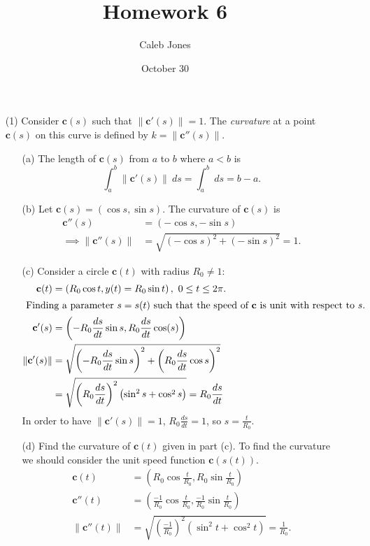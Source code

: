 \documentclass{article}
\title{Homework 6}
\author{Caleb Jones}
\date{October 30}
\renewcommand\vec[1]{\mathbf{#1}}
\newcommand\norm[1]{\left\lVert#1\right\rVert}
\newcommand\dsdt{\frac{ds}{dt}}
\begin{document}
\maketitle


\begin{enumerate}[leftmargin=*]
\item[(1)]
  Consider $\vec{c}(s)$ such that $\norm{\vec{c}'(s)} = 1$.
  The \emph{curvature} at a point $\vec{c}(s)$ on this curve is defined by $k = \norm{\vec{c}''(s)}$.

  \begin{enumerate}
  \item[(a)] The length of $\vec{c}(s)$ from $a$ to $b$ where $a < b$ is
    \[ \int_a^b \norm{\vec{c}'(s)}\ ds = \int_a^b\ ds = b - a. \]
    
  \item[(b)] Let $\vec{c}(s) = (\cos s, \sin s)$.
    The curvature of $\vec{c}(s)$ is
    \begin{align*}
      \vec{c}''(s) & = (-\cos s, -\sin s) \\
      \implies \norm{\vec{c}''(s)} 
      & = \sqrt{{\left(-\cos s\right)}^2 + {\left(-\sin s\right)}^2}
      = 1.
    \end{align*}

  \item[(c)] Consider a circle $\vec{c}(t)$ with radius $R_0 \ne 1$:
    \begin{align*}
      \vec{c}(t) &= \left( R_0 \cos t, y(t) = R_0 \sin t \right),\ 0 \leq t \leq 2\pi. \\
      \intertext{
        Finding a parameter $s = s(t)$ such that the speed of $\vec{c}$ is unit with respect to $s$.
      }
      \vec{c}'(s) &= \left( -R_0 \dsdt \sin s, R_0 \dsdt \cos(s) \right) \\
      \norm{\vec{c}'(s)} &= \sqrt{{\left(-R_0 \dsdt \sin s\right)}^2 + {\left(R_0 \dsdt \cos s \right)}^2} \\
      &= \sqrt{{\left( R_0 \dsdt \right)}^2 \left( \sin^2 s + \cos^2 s\right)} = R_0 \dsdt
    \end{align*}
    In order to have $\norm{\vec{c}'(s)} = 1$, $R_0 \dsdt = 1$, so $s = \frac{t}{R_0}$.
    
  \item[(d)] Find the curvature of $\vec{c}(t)$ given in part (c).
    To find the curvature we should consider the unit speed function $\vec{c}(s(t))$.
    \begin{align*}
      \vec{c}(t) &= \left(R_0 \cos \frac{t}{R_0}, R_0 \sin \frac{t}{R_0} \right) \\
      \vec{c}''(t) &= \left(\frac{-1}{R_0} \cos \frac{t}{R_0}, \frac{-1}{R_0} \sin \frac{t}{R_0} \right) \\
      \norm{\vec{c}''(t)} &= \sqrt{{\left(\frac{-1}{R_0}\right)}^2 \left( \sin^2 t + \cos^2 t \right)} = \frac{1}{R_0}.
    \end{align*}
  \end{enumerate}


\end{enumerate}
\end{document}
